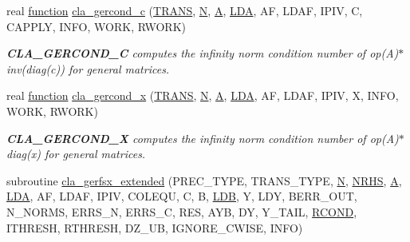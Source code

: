 \begin{DoxyCompactItemize}
real \hyperlink{afunc_8m_a7b5e596df91eadea6c537c0825e894a7}{function} \hyperlink{group__complexGEcomputational_ga3c43cd4abafdf0471ce472659e5beaa4}{cla\+\_\+gercond\+\_\+c} (\hyperlink{superlu__enum__consts_8h_a0c4e17b2d5cea33f9991ccc6a6678d62a1f61e3015bfe0f0c2c3fda4c5a0cdf58}{T\+R\+A\+N\+S}, \hyperlink{polmisc_8c_a0240ac851181b84ac374872dc5434ee4}{N}, \hyperlink{classA}{A}, \hyperlink{example__user_8c_ae946da542ce0db94dced19b2ecefd1aa}{L\+D\+A}, A\+F, L\+D\+A\+F, I\+P\+I\+V, C, C\+A\+P\+P\+L\+Y, I\+N\+F\+O, W\+O\+R\+K, R\+W\+O\+R\+K)
\begin{DoxyCompactList}\small\item\em {\bfseries C\+L\+A\+\_\+\+G\+E\+R\+C\+O\+N\+D\+\_\+\+C} computes the infinity norm condition number of op(\+A)$\ast$inv(diag(c)) for general matrices. \end{DoxyCompactList}\item 
real \hyperlink{afunc_8m_a7b5e596df91eadea6c537c0825e894a7}{function} \hyperlink{group__complexGEcomputational_gadb9d40c4c3383a6fc0987f9b356f9044}{cla\+\_\+gercond\+\_\+x} (\hyperlink{superlu__enum__consts_8h_a0c4e17b2d5cea33f9991ccc6a6678d62a1f61e3015bfe0f0c2c3fda4c5a0cdf58}{T\+R\+A\+N\+S}, \hyperlink{polmisc_8c_a0240ac851181b84ac374872dc5434ee4}{N}, \hyperlink{classA}{A}, \hyperlink{example__user_8c_ae946da542ce0db94dced19b2ecefd1aa}{L\+D\+A}, A\+F, L\+D\+A\+F, I\+P\+I\+V, X, I\+N\+F\+O, W\+O\+R\+K, R\+W\+O\+R\+K)
\begin{DoxyCompactList}\small\item\em {\bfseries C\+L\+A\+\_\+\+G\+E\+R\+C\+O\+N\+D\+\_\+\+X} computes the infinity norm condition number of op(\+A)$\ast$diag(x) for general matrices. \end{DoxyCompactList}\item 
subroutine \hyperlink{group__complexGEcomputational_ga929fb2d32408f812f7fd624706ba0af4}{cla\+\_\+gerfsx\+\_\+extended} (P\+R\+E\+C\+\_\+\+T\+Y\+P\+E, T\+R\+A\+N\+S\+\_\+\+T\+Y\+P\+E, \hyperlink{polmisc_8c_a0240ac851181b84ac374872dc5434ee4}{N}, \hyperlink{example__user_8c_aa0138da002ce2a90360df2f521eb3198}{N\+R\+H\+S}, \hyperlink{classA}{A}, \hyperlink{example__user_8c_ae946da542ce0db94dced19b2ecefd1aa}{L\+D\+A}, A\+F, L\+D\+A\+F, I\+P\+I\+V, C\+O\+L\+E\+Q\+U, C, B, \hyperlink{example__user_8c_a50e90a7104df172b5a89a06c47fcca04}{L\+D\+B}, Y, L\+D\+Y, B\+E\+R\+R\+\_\+\+O\+U\+T, N\+\_\+\+N\+O\+R\+M\+S, E\+R\+R\+S\+\_\+\+N, E\+R\+R\+S\+\_\+\+C, R\+E\+S, A\+Y\+B, D\+Y, Y\+\_\+\+T\+A\+I\+L, \hyperlink{superlu__enum__consts_8h_af00a42ecad444bbda75cde1b64bd7e72a9b5c151728d8512307565994c89919d5}{R\+C\+O\+N\+D}, I\+T\+H\+R\+E\+S\+H, R\+T\+H\+R\+E\+S\+H, D\+Z\+\_\+\+U\+B, I\+G\+N\+O\+R\+E\+\_\+\+C\+W\+I\+S\+E, I\+N\+F\+O)

\end{DoxyCompactItemize}
